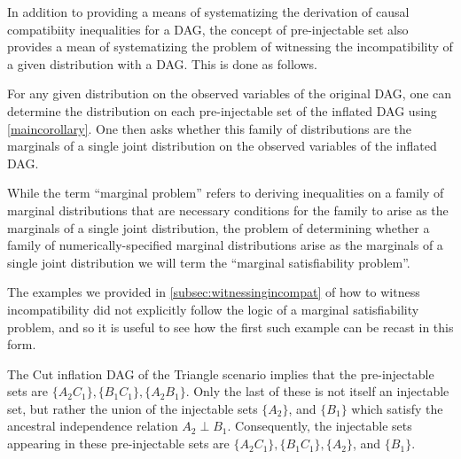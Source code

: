 \documentclass[aps,english,superscriptaddress,onecolumn,twoside,longbibliography,pra,floatfix,fleqn,nofootinbib]{revtex4-1}%
\theoremstyle{definition}
\begin{document}
In addition to providing a means of systematizing the derivation of causal compatibiity inequalities for a DAG, the concept of pre-injectable set also provides a mean of systematizing the problem of witnessing the incompatibility of a given distribution with a DAG.  This is done as follows.

For any given distribution on the observed variables of the original DAG, one can determine the distribution on each pre-injectable set of the inflated DAG using \cref{maincorollary}.  One then asks whether this family of distributions are the marginals of a single joint distribution on the observed variables of the inflated DAG.  

While the term ``marginal problem'' refers to deriving inequalities on a family of marginal distributions that are necessary conditions for the family to arise as the marginals of a single joint distribution, the problem of determining whether a family of numerically-specified marginal distributions arise as the marginals of a single joint distribution we will term the ``marginal satisfiability problem''.


The examples we provided in \cref{subsec:witnessingincompat} of how to witness incompatibility did not explicitly follow the logic of a marginal satisfiability problem, and so it is useful to see how the first such example can be recast in this form.  

 
 The Cut inflation DAG  of the Triangle scenario implies that the pre-injectable sets are $\{
A_2 C_1\}, \{B_1 C_1\}, \{ A_2 B_1\}$.  Only the last of these is not itself an injectable set, but rather the union of the injectable sets $\{ A_2\}$, and $\{ B_1\}$ which satisfy the ancestral independence relation $A_2 \perp B_1$.  
Consequently, the injectable sets appearing in these pre-injectable sets are $\{A_2 C_1\}, \{B_1 C_1\}, \{ A_2\}$, and $\{ B_1\}$.
\end{document}
